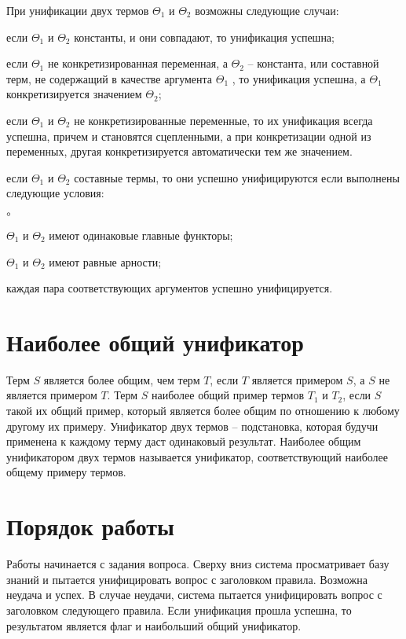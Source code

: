 При унификации двух термов \(\Theta_1 \) и \(\Theta_2 \)  возможны следующие случаи:
\begin{list}{\textbullet }{}
	\item если \(\Theta_1 \) и \(\Theta_2 \) константы, и они совпадают, то унификация успешна;
	\item если \(\Theta_1 \)  не конкретизированная переменная, а \(\Theta_2 \) -- константа, или составной терм, не содержащий в качестве аргумента \(\Theta_1 \) , то унификация успешна, а \(\Theta_1 \)  конкретизируется значением \(\Theta_2 \);
	\item если \(\Theta_1 \)  и \(\Theta_2 \) не конкретизированные переменные, то их унификация всегда успешна, причем  и  становятся сцепленными, а при конкретизации одной из переменных, другая конкретизируется автоматически тем же значением.
	\item если \(\Theta_1 \)  и \(\Theta_2 \) составные термы, то они успешно унифицируются если выполнены следующие условия:
	\begin{list}{$\circ$ }{}
		\item \(\Theta_1 \)  и \(\Theta_2 \) имеют одинаковые главные функторы;
		\item \(\Theta_1 \)  и \(\Theta_2 \) имеют равные арности;
		\item каждая пара соответствующих аргументов успешно унифицируется. 
	\end{list}
\end{list}

\section{Наиболее общий унификатор}
Терм \(S\) является более общим, чем терм \(T\), если \(T\) является примером  \(S\), а \(S\) не является примером \(T\).
Терм \(S\) наиболее общий пример термов \(T_1\) и \(T_2\), если \(S\) такой их общий пример, который является более общим по отношению к любому другому их примеру. Унификатор двух термов -- подстановка, которая будучи применена к каждому терму даст одинаковый результат. Наиболее общим унификатором двух термов называется унификатор, соответствующий наиболее общему примеру термов. 
 
\section{Порядок работы}
Работы начинается с задания вопроса. Сверху вниз система просматривает базу знаний и пытается унифицировать вопрос с заголовком правила. Возможна неудача и успех. В случае неудачи, система пытается унифицировать вопрос с заголовком следующего правила. Если  унификация прошла успешна, то результатом является флаг и наибольший общий унификатор.

